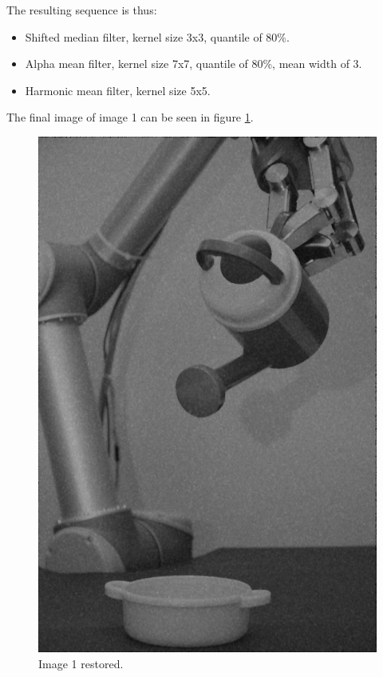 The resulting sequence is thus:
\begin{itemize}
 \item Shifted median filter, kernel size 3x3, quantile of 80\%.
 \item Alpha mean filter, kernel size 7x7, quantile of 80\%, mean width of 3.
 \item Harmonic mean filter, kernel size 5x5.
\end{itemize}

The final image of image 1 can be seen in figure \ref{fig:final_image1}.

\begin{figure}[H]
\centering
\includegraphics[width = \fullImageWidth]{../code/images/image_result_1.png}
\caption{Image 1 restored.}
\label{fig:final_image1}
\end{figure}
